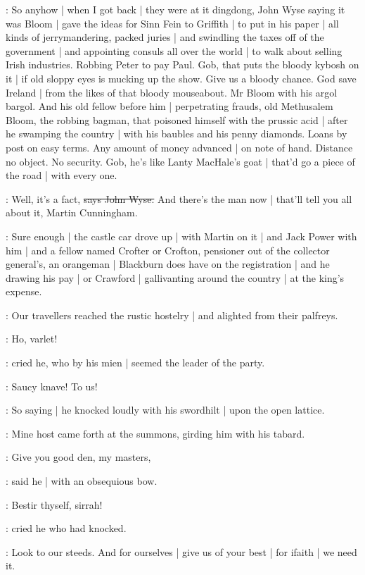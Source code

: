 \Nq:
So anyhow |
when I got back |
they were at it dingdong,
John Wyse saying it was Bloom |
gave the ideas for Sinn Fein to Griffith |
to put in his paper |
all kinds of jerrymandering,
packed juries |
and swindling the taxes off of the government |
and appointing consuls all over the world |
to walk about selling Irish industries.
Robbing Peter to pay Paul.
Gob,
that puts the bloody kybosh on it |
if old sloppy eyes is mucking up the show.
Give us a bloody chance.
God save Ireland |
from the likes of that bloody mouseabout.
Mr Bloom with his argol bargol.
And his old fellow before him |
perpetrating frauds,
old Methusalem Bloom,
the robbing bagman,
that poisoned himself with the prussic acid |
after he swamping the country |
with his baubles and his penny diamonds.
Loans by post on easy terms.
Any amount of money advanced |
on note of hand.
Distance no object.
No security.
Gob,
he's like Lanty MacHale's goat |
that'd go a piece of the road |
with every one.

\johnwyse:
Well,
it's a fact,
\sout{says John Wyse.}
And there's the man now |
that'll tell you all about it,
Martin Cunningham.

\Nq:
Sure enough |
the castle car drove up |
with Martin on it |
and Jack Power with him |
and a fellow named Crofter or Crofton,
pensioner out of the collector general's,
an orangeman |
Blackburn does have on the registration |
and he drawing his pay |
or Crawford |
gallivanting around the country |
at the king's expense.

:
Our travellers reached the rustic hostelry |
and alighted from their palfreys.

\cunningham:
Ho,
varlet!

:
cried he,
who by his mien |
seemed the leader of the party.

\cunningham:
Saucy knave!
To us!

:
So saying |
he knocked loudly with his swordhilt |
upon the open lattice.

:
Mine host came forth at the summons,
girding him with his tabard.

\terry:
Give you good den,
my masters,

:
said he |
with an obsequious bow.

\cunningham:
Bestir thyself,
sirrah!

:
cried he who had knocked.

\cunningham:
Look to our steeds.
And for ourselves |
give us of your best |
for ifaith |
we need it.

